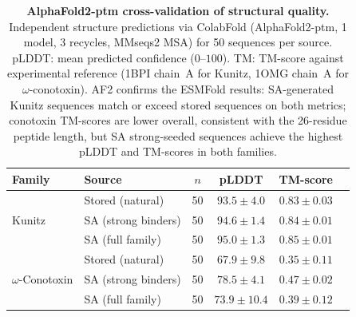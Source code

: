 \documentclass{article}
\theoremstyle{definition}
\theoremstyle{remark}
\begin{document}
\begin{table}[p]
  \centering
  \caption{\textbf{AlphaFold2-ptm cross-validation of structural quality.}
  Independent structure predictions via ColabFold (AlphaFold2-ptm, 1 model,
  3 recycles, MMseqs2 MSA) for 50 sequences per source.
  pLDDT: mean predicted confidence ($0$--$100$).
  TM: TM-score against experimental reference (1BPI chain~A for Kunitz,
  1OMG chain~A for $\omega$-conotoxin).
  AF2 confirms the ESMFold results: SA-generated Kunitz sequences match or
  exceed stored sequences on both metrics; conotoxin TM-scores are lower
  overall, consistent with the 26-residue peptide length, but SA strong-seeded
  sequences achieve the highest pLDDT and TM-scores in both families.}
  \label{tab:af2-validation}
  \small
  \begin{tabular}{llcccc}
    \toprule
    Family & Source & $n$ & pLDDT & TM-score \\
    \midrule
    \multirow{3}{*}{Kunitz}
      & Stored (natural)       & 50 & $93.5 \pm 4.0$ & $0.83 \pm 0.03$ \\
      & SA (strong binders)    & 50 & $94.6 \pm 1.4$ & $0.84 \pm 0.01$ \\
      & SA (full family)       & 50 & $95.0 \pm 1.3$ & $0.85 \pm 0.01$ \\
    \midrule
    \multirow{3}{*}{$\omega$-Conotoxin}
      & Stored (natural)       & 50 & $67.9 \pm 9.8$ & $0.35 \pm 0.11$ \\
      & SA (strong binders)    & 50 & $78.5 \pm 4.1$ & $0.47 \pm 0.02$ \\
      & SA (full family)       & 50 & $73.9 \pm 10.4$ & $0.39 \pm 0.12$ \\
    \bottomrule
  \end{tabular}
\end{table}
\end{document}

